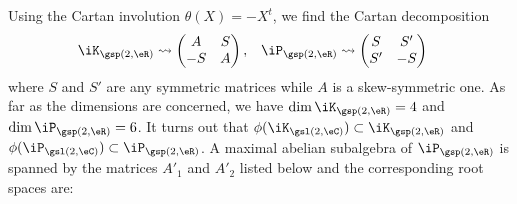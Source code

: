 Using the Cartan involution $\theta(X)=-X^t$, we find the Cartan decomposition
\begin{align}
\iK_{\gsp(2,\eR)}&\leadsto
\begin{pmatrix}
A&S\\-S&A
\end{pmatrix},
&\iP_{\gsp(2,\eR)}&\leadsto
\begin{pmatrix}
S&S'\\S'&-S
\end{pmatrix}
\end{align}
where $S$ and $S'$ are any symmetric matrices while $A$ is a skew-symmetric one. As far as the dimensions are concerned, we have $\dim\iK_{\gsp(2,\eR)}=4$ and $\dim\iP_{\gsp(2,\eR)}=6$. It turns out that $\phi(\iK_{\gsl(2,\eC)})\subset\iK_{\gsp(2,\eR)}$ and $\phi(\iP_{\gsl(2,\eC)})\subset \iP_{\gsp(2,\eR)}$. A maximal abelian subalgebra of $\iP_{\gsp(2,\eR)}$ is spanned by the matrices $A'_1$ and $A'_2$ listed below and the corresponding root spaces are:
